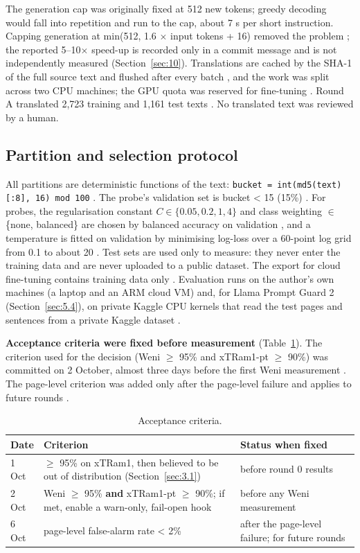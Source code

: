 \documentclass[11pt]{article}
\newcommand{\code}[1]{\texttt{#1}}
\begin{document}
The generation cap was originally fixed at 512 new tokens; greedy decoding would fall into repetition and run to the cap, about 7 s per short instruction. Capping generation at min(512, 1.6 \ensuremath{\times} input tokens + 16) removed the problem%
; the reported 5–10\ensuremath{\times} speed-up is recorded only in a commit message and is not independently measured (Section~\ref{sec:10}). Translations are cached by the SHA-1 of the full source text and flushed after every batch%
, and the work was split across two CPU machines; the GPU quota was reserved for fine-tuning%
. Round A translated 2,723 training and 1,161 test texts%
. No translated text was reviewed by a human.

\subsection{Partition and selection protocol}\label{sec:3.3}

All partitions are deterministic functions of the text: \code{bucket = int(md5(text)[:8], 16) mod 100}%
. The probe's validation set is bucket \textless{} 15 (15\%)%
. For probes, the regularisation constant $C \in \{0.05, 0.2, 1, 4\}$ and class weighting \ensuremath{\in} \{none, balanced\} are chosen by balanced accuracy on validation%
, and a temperature is fitted on validation by minimising log-loss over a 60-point log grid from 0.1 to about 20%
. Test sets are used only to measure: they never enter the training data and are never uploaded to a public dataset. The export for cloud fine-tuning contains training data only%
. Evaluation runs on the author's own machines (a laptop and an ARM cloud VM) and, for Llama Prompt Guard 2 (Section~\ref{sec:5.4}), on private Kaggle CPU kernels that read the test pages and sentences from a private Kaggle dataset%
.

\textbf{Acceptance criteria were fixed before measurement} (Table~\ref{tab:2}). The criterion used for the decision (Weni \ensuremath{\geq} 95\% and xTRam1-pt \ensuremath{\geq} 90\%) was committed on 2 October, almost three days before the first Weni measurement%
. The page-level criterion was added only after the page-level failure and applies to future rounds%
.

\begin{table}[tbp]
\centering
\small
\caption{Acceptance criteria.}\label{tab:2}
\begin{tabularx}{\linewidth}{@{}l>{\raggedright\arraybackslash\hsize=1.29\hsize}X>{\raggedright\arraybackslash\hsize=0.71\hsize}X@{}}
\toprule
Date & Criterion & Status when fixed \\
\midrule
1 Oct & \ensuremath{\geq} 95\% on xTRam1, then believed to be out of distribution (Section~\ref{sec:3.1}) %
 & before round 0 results \\
2 Oct & Weni \ensuremath{\geq} 95\% \textbf{and} xTRam1-pt \ensuremath{\geq} 90\%; if met, enable a warn-only, fail-open hook %
 & before any Weni measurement \\
6 Oct & page-level false-alarm rate \textless{} 2\% %
 & after the page-level failure; for future rounds \\
\bottomrule
\end{tabularx}
\end{table}
\end{document}
